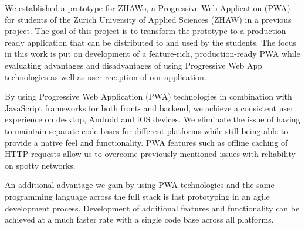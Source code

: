 \begin{markdown}
We established a prototype for ZHAWo, a Progressive Web Application (PWA) for students of the Zurich University of Applied Sciences (ZHAW) in a previous project. The goal of this project is to transform the prototype to a production-ready application that can be distributed to and used by the students. The focus in this work is put on development of a feature-rich, production-ready PWA while evaluating advantages and disadvantages of using Progressive Web App technologies as well as user reception of our application.

By using Progressive Web Application (PWA) technologies \cite{PWA} in combination with JavaScript frameworks for both front- and backend, we achieve a consistent user experience on desktop, Android and iOS devices. We eliminate the issue of having to maintain separate code bases for different platforms while still being able to provide a native feel and functionality. PWA features such as offline caching of HTTP requests allow us to overcome previously mentioned issues with reliability on spotty networks.

An additional advantage we gain by using PWA technologies and the same programming language across the full stack is fast prototyping in an agile development process. Development of additional features and functionality can be achieved at a much faster rate with a single code base across all platforms.

\newpage

\end{markdown}

